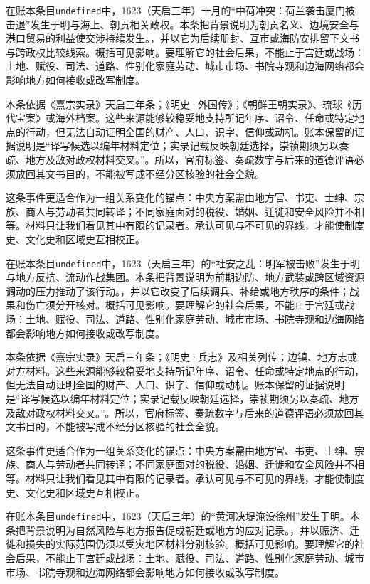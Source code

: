 在账本条目\texttt{undefined}中，1623（天启三年）十月的“中荷冲突：荷兰袭击厦门被击退”发生于明与海上、朝贡相关政权。本条把背景说明为朝贡名义、边境安全与港口贸易的利益使交涉持续发生。，并以它为后续册封、互市或海防安排留下文书与跨政权比较线索。概括可见影响。要理解它的社会后果，不能止于宫廷或战场：土地、赋役、司法、道路、性别化家庭劳动、城市市场、书院寺观和边海网络都会影响地方如何接收或改写制度。

本条依据《熹宗实录》天启三年条；《明史·外国传》；《朝鲜王朝实录》、琉球《历代宝案》或海外档案。这些来源能够较稳妥地支持所记年序、诏令、任命或特定地点的行动，但无法自动证明全国的财产、人口、识字、信仰或动机。账本保留的证据说明是“译写候选以编年材料定位；实录记载反映朝廷选择，崇祯期须另以奏疏、地方及敌对政权材料交叉。”。所以，官府标签、奏疏数字与后来的道德评语必须放回其文书目的，不能被写成不经分区核验的社会全貌。

这条事件更适合作为一组关系变化的锚点：中央方案需由地方官、书吏、士绅、宗族、商人与劳动者共同转译；不同家庭面对的税役、婚姻、迁徙和安全风险并不相等。材料只让我们看见其中有限的记录者。承认可见与不可见的界线，才能使制度史、文化史和区域史互相校正。

在账本条目\texttt{undefined}中，1623（天启三年）的“社安之乱：明军被击败”发生于明与地方反抗、流动作战集团。本条把背景说明为前期边防、地方武装或跨区域资源调动的压力推动了该行动。，并以它改变了后续调兵、补给或地方秩序的条件；战果和伤亡须分开核对。概括可见影响。要理解它的社会后果，不能止于宫廷或战场：土地、赋役、司法、道路、性别化家庭劳动、城市市场、书院寺观和边海网络都会影响地方如何接收或改写制度。

本条依据《熹宗实录》天启三年条；《明史·兵志》及相关列传；边镇、地方志或对方材料。这些来源能够较稳妥地支持所记年序、诏令、任命或特定地点的行动，但无法自动证明全国的财产、人口、识字、信仰或动机。账本保留的证据说明是“译写候选以编年材料定位；实录记载反映朝廷选择，崇祯期须另以奏疏、地方及敌对政权材料交叉。”。所以，官府标签、奏疏数字与后来的道德评语必须放回其文书目的，不能被写成不经分区核验的社会全貌。

这条事件更适合作为一组关系变化的锚点：中央方案需由地方官、书吏、士绅、宗族、商人与劳动者共同转译；不同家庭面对的税役、婚姻、迁徙和安全风险并不相等。材料只让我们看见其中有限的记录者。承认可见与不可见的界线，才能使制度史、文化史和区域史互相校正。

在账本条目\texttt{undefined}中，1623（天启三年）的“黄河决堤淹没徐州”发生于明。本条把背景说明为自然风险与地方报告促成朝廷或地方的应对记录。，并以赈济、迁徙和损失的实际范围仍须以受灾地区材料分别核验。概括可见影响。要理解它的社会后果，不能止于宫廷或战场：土地、赋役、司法、道路、性别化家庭劳动、城市市场、书院寺观和边海网络都会影响地方如何接收或改写制度。

